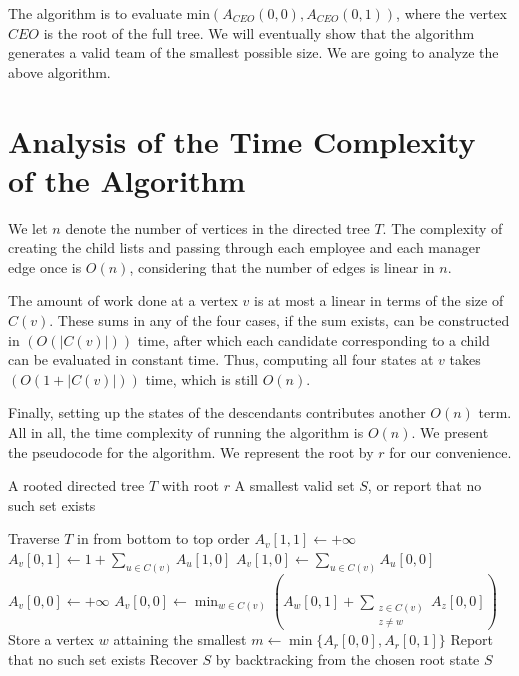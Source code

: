 \documentclass[ a4paper, 11pt]{report}
\theoremstyle{plain}
\theoremstyle{definition}
\begin{document}
The algorithm is to evaluate $\text{min}\left (A_{CEO}(0, 0), A_{CEO}(0, 1)
\right )$, where the vertex $CEO$ is the root of the full tree. We will eventually show that the algorithm generates a valid team of the smallest possible size. We are going to analyze the above algorithm.

\section{Analysis of the Time Complexity of the Algorithm}

We let $n$ denote the number of vertices in the directed tree $T$. The complexity of creating the child lists and passing through each employee and each manager edge once is $O(n)$, considering that the number of edges is linear in $n$.
\newline

The amount of work done at a vertex $v$ is at most a linear in terms of the size of $C(v)$. These sums in any of the four cases, if the sum exists, can be constructed in $(O(|C(v)|))$ time, after which each candidate corresponding to a child can be evaluated in constant time. Thus, computing all four states at $v$ takes $(O(1+|C(v)|))$ time, which is still $O(n)$.
\newline

Finally, setting up the states of the descendants contributes another $O(n)$ term. All in all, the time complexity of running the algorithm is $O(n)$. We present the pseudocode for the algorithm. We represent the root by $r$ for our convenience. 

\begin{algorithm}
\caption{UniqueDomIndpSet}
\label{alg:mincommteam}
\begin{algorithmic}[1]
\Require A rooted directed tree $T$ with root $r$
\Ensure A smallest valid set $S$, or report that no such set exists

\State Traverse $T$ in from bottom to top order
    \State $A_v[1,1] \gets +\infty$
    \State $A_v[0,1] \gets 1+\sum\limits_{u\in C(v)} A_u[1,0]$
    \State $A_v[1,0] \gets \sum\limits_{u\in C(v)} A_u[0,0]$
        \State $A_v[0,0] \gets +\infty$
    \Else
        \State $A_v[0,0] \gets
        \displaystyle\min_{w\in C(v)}
        \left(
        A_w[0,1]+
        \sum\limits_{\substack{z\in C(v)\\z\neq w}} A_z[0,0]
        \right)$
        \State Store a vertex $w$ attaining the smallest
    \EndIf
\EndFor
\State $m \gets \min\{A_r[0,0],A_r[0,1]\}$
    \State Report that no such set exists
\Else
    \State Recover $S$ by backtracking from the chosen root state
    \State \Return $S$
\EndIf
\end{algorithmic}
\end{algorithm}
\end{document}
